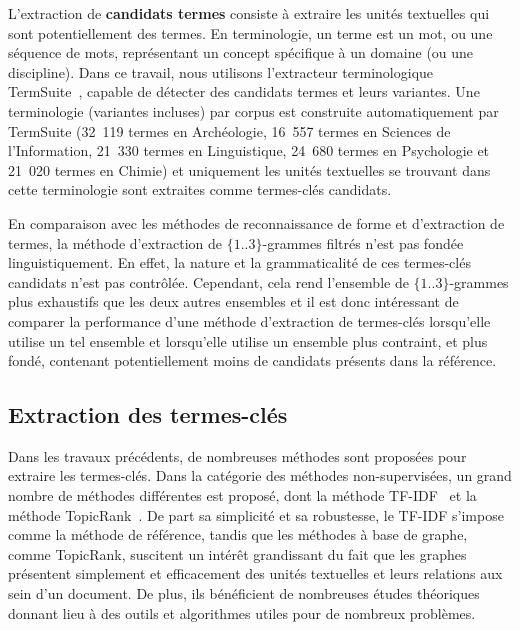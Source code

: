     L'extraction de \textbf{candidats termes} consiste à extraire les unités
    textuelles qui sont potentiellement des termes. En terminologie, un terme
    est un mot, ou une séquence de mots, représentant un concept spécifique à un
    domaine (ou une discipline). Dans ce travail, nous utilisons l'extracteur
    terminologique TermSuite~\cite{rocheteau2011termsuite}, capable de détecter
    des candidats termes et leurs variantes. Une terminologie (variantes
    incluses) par corpus est construite automatiquement par TermSuite (32~119
    termes en Archéologie, 16~557 termes en Sciences de l'Information, 21~330
    termes en Linguistique, 24~680 termes en Psychologie et 21~020 termes en
    Chimie) et uniquement les unités textuelles se trouvant dans cette
    terminologie sont extraites comme termes-clés candidats.

    
    En comparaison avec les méthodes de reconnaissance de forme et d'extraction
    de termes, la méthode d'extraction de $\{1..3\}$-grammes filtrés n'est pas
    fondée linguistiquement. En effet, la nature et la grammaticalité de ces
    termes-clés candidats n'est pas contrôlée. Cependant, cela rend l'ensemble
    de $\{1..3\}$-grammes plus exhaustifs que les deux autres ensembles et il
    est donc intéressant de comparer la performance d'une méthode d'extraction
    de termes-clés lorsqu'elle utilise un tel ensemble et lorsqu'elle utilise un
    ensemble plus contraint, et plus fondé, contenant potentiellement moins de
    candidats présents dans la référence.

  \subsection{Extraction des termes-clés}
  \label{subsec:extraction_de_termes_cles}
    Dans les travaux précédents, de nombreuses méthodes sont proposées pour
    extraire les termes-clés. Dans la catégorie des méthodes non-supervisées, un
    grand nombre de méthodes différentes est proposé, dont la méthode
    TF-IDF~\cite{jones1972tfidf} et la méthode
    TopicRank~\cite{bougouin2013topicrank}. De part sa simplicité et sa
    robustesse, le TF-IDF s'impose comme la méthode de référence, tandis que les
    méthodes à base de graphe, comme TopicRank, suscitent un intérêt
    grandissant du fait que les graphes présentent simplement et efficacement
    des unités textuelles et leurs relations aux sein d'un document. De plus,
    ils bénéficient de nombreuses études théoriques donnant lieu à des outils et
    algorithmes utiles pour de nombreux problèmes.

